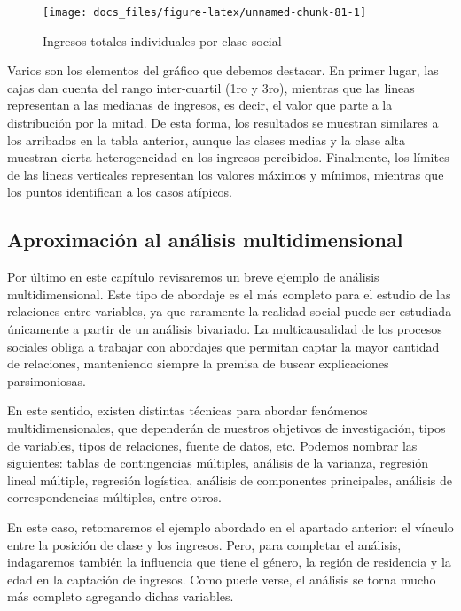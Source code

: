\documentclass[
]{article}
\begin{document}
\begin{figure}

{\centering \texttt{[image: docs\_files/figure-latex/unnamed-chunk-81-1]} 

}

\caption{Ingresos totales individuales por clase social}\label{fig:unnamed-chunk-81}
\end{figure}

Varios son los elementos del gráfico que debemos destacar. En primer lugar, las cajas dan cuenta del rango inter-cuartil (1ro y 3ro), mientras que las lineas representan a las medianas de ingresos, es decir, el valor que parte a la distribución por la mitad. De esta forma, los resultados se muestran similares a los arribados en la tabla anterior, aunque las clases medias y la clase alta muestran cierta heterogeneidad en los ingresos percibidos. Finalmente, los límites de las lineas verticales representan los valores máximos y mínimos, mientras que los puntos identifican a los casos atípicos.

\hypertarget{aprox}{%
\subsection{Aproximación al análisis multidimensional}\label{aprox}}

Por último en este capítulo revisaremos un breve ejemplo de análisis multidimensional. Este tipo de abordaje es el más completo para el estudio de las relaciones entre variables, ya que raramente la realidad social puede ser estudiada únicamente a partir de un análisis bivariado. La multicausalidad de los procesos sociales obliga a trabajar con abordajes que permitan captar la mayor cantidad de relaciones, manteniendo siempre la premisa de buscar explicaciones parsimoniosas.

En este sentido, existen distintas técnicas para abordar fenómenos multidimensionales, que dependerán de nuestros objetivos de investigación, tipos de variables, tipos de relaciones, fuente de datos, etc. Podemos nombrar las siguientes: tablas de contingencias múltiples, análisis de la varianza, regresión lineal múltiple, regresión logística, análisis de componentes principales, análisis de correspondencias múltiples, entre otros.

En este caso, retomaremos el ejemplo abordado en el apartado anterior: el vínculo entre la posición de clase y los ingresos. Pero, para completar el análisis, indagaremos también la influencia que tiene el género, la región de residencia y la edad en la captación de ingresos. Como puede verse, el análisis se torna mucho más completo agregando dichas variables.
\end{document}
